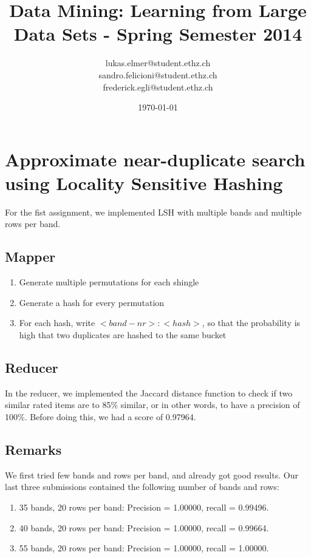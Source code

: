 \documentclass[a4paper, 11pt]{article}
\title{Data Mining: Learning from Large Data Sets - Spring Semester 2014}
\author{lukas.elmer@student.ethz.ch\\ sandro.felicioni@student.ethz.ch\\ frederick.egli@student.ethz.ch\\}
\date{\today}
\begin{document}
\maketitle

\section{Approximate near-duplicate search using Locality Sensitive Hashing} 

For the fist assignment, we implemented LSH with multiple bands and multiple rows per band.

\subsection{Mapper}

\begin{enumerate}
\item Generate multiple permutations for each shingle
\item Generate a hash for every permutation
\item For each hash, write $<band-nr>:<hash>$, so that the probability is high that two duplicates are hashed to the same bucket
\end{enumerate}

\subsection{Reducer}


In the reducer, we implemented the Jaccard distance function to check if two similar rated items are to 85\% similar, or in other words, to have a precision of 100\%. Before doing this, we had a score of 0.97964.


\subsection{Remarks}

We first tried few bands and rows per band, and already got good results. Our last three submissions contained the following number of bands and rows:

\begin{enumerate}
\item 35 bands, 20 rows per band: Precision = 1.00000, recall = 0.99496.
\item 40 bands, 20 rows per band: Precision = 1.00000, recall = 0.99664.
\item 55 bands, 20 rows per band: Precision = 1.00000, recall = 1.00000.
\end{enumerate}
\end{document}
